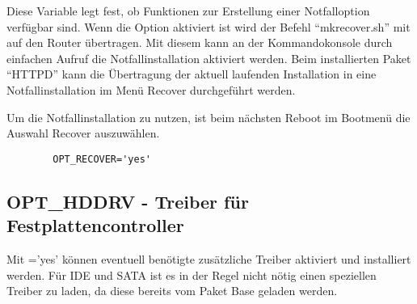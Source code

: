         Diese Variable legt fest, ob Funktionen zur Erstellung
        einer Notfalloption verfügbar sind.
        Wenn die Option aktiviert ist wird der Befehl ``mkrecover.sh'' mit auf den
        Router übertragen. Mit diesem kann an der Kommandokonsole durch einfachen
        Aufruf die Notfallinstallation aktiviert werden. Beim installierten Paket ``HTTPD''
        kann die Übertragung der aktuell laufenden Installation in eine Notfallinstallation
        im Menü Recover durchgeführt werden.

        Um die Notfallinstallation zu nutzen, ist beim nächsten Reboot im Bootmenü die Auswahl
        Recover auszuwählen.

\begin{example}
\begin{verbatim}
        OPT_RECOVER='yes'
\end{verbatim}
\end{example}

\subsection {OPT\_HDDRV - Treiber für Festplattencontroller}

    Mit ='yes' können eventuell benötigte zusätzliche Treiber
    aktiviert und installiert werden.
    Für IDE und SATA ist es in der Regel nicht nötig einen speziellen Treiber zu laden,
    da diese bereits vom Paket Base geladen werden.

